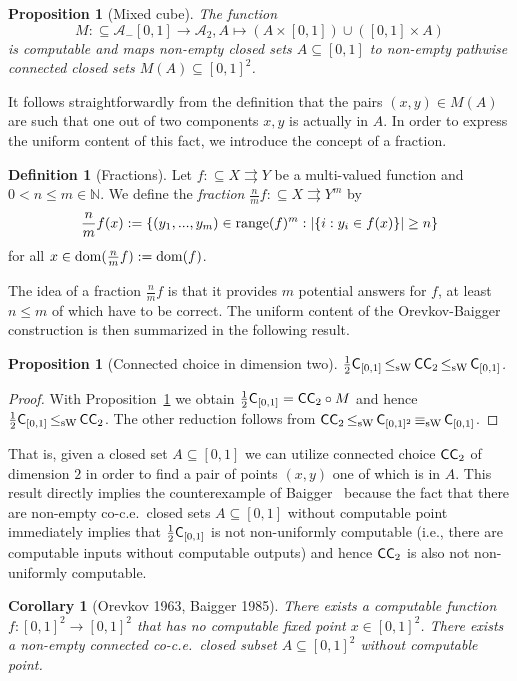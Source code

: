\documentclass[a4paper]{amsart}
\def\AA{{\mathcal A}}
\def\IN{{\mathbb{N}}}
\def\In{\subseteq}
\def\mto{\rightrightarrows}
\def\dom{{\rm dom}}
\def\range{{\rm range}}
\def\C{\mbox{\rm\sffamily C}}
\def\ConC{\mbox{\rm\sffamily CC}}
\def\leqSW{\mathop{\leq_{\mathrm{sW}}}}
\def\equivSW{\mathop{\equiv_{\mathrm{sW}}}}
\newtheorem{proposition}[theorem]{Proposition}
\newtheorem{corollary}[theorem]{Corollary}
\theoremstyle{definition}
\newtheorem{definition}[theorem]{Definition}
\begin{document}
\begin{proposition}[Mixed cube]
\label{prop:mixed-cube}
The function 
\[M:\In\AA_-[0,1]\to\AA_2,A\mapsto(A\times[0,1])\cup([0,1]\times A)\]
is computable and maps non-empty closed sets $A\In[0,1]$
to non-empty pathwise connected closed sets $M(A)\In[0,1]^2$.
\end{proposition}

It follows straightforwardly from the definition that the pairs $(x,y)\in M(A)$ are
such that one out of two components $x,y$ is actually in $A$. 
In order to express the uniform content of this fact, we introduce the concept of a fraction.

\begin{definition}[Fractions]
Let $f:\In X\mto Y$ be a multi-valued function and $0<n\leq m\in\IN$. We define the 
{\em fraction} $\frac{n}{m}f:\In X\mto Y^m$ by
\[\frac{n}{m}f(x):=\{(y_1,...,y_m)\in\range(f)^m:|\{i:y_i\in f(x)\}|\geq n\}\]
for all $x\in\dom(\frac{n}{m}f):=\dom(f)$.
\end{definition}

The idea of a fraction $\frac{n}{m}f$ is that it provides $m$ potential answers for $f$,
at least $n\leq m$ of which have to be correct. The uniform content of the Orevkov-Baigger construction is
then summarized in the following result.

\begin{proposition}[Connected choice in dimension two]
\label{prop:dimension-two}
$\frac{1}{2}\C_{[0,1]}\leqSW\ConC_2\leqSW\C_{[0,1]}$.
\end{proposition}
\begin{proof}
With Proposition~\ref{prop:mixed-cube} we obtain $\frac{1}{2}\C_{[0,1]}=\ConC_2\circ M$
and hence $\frac{1}{2}\C_{[0,1]}\leqSW\ConC_2$. The other reduction follows
from $\ConC_2\leqSW\C_{[0,1]^2}\equivSW\C_{[0,1]}$.
\end{proof}

That is, given a closed set $A\In[0,1]$ we can utilize connected choice $\ConC_2$ of dimension $2$
in order to find a pair of points $(x,y)$ one of which is in $A$. 
This result directly implies the counterexample of Baigger~\cite{Bai85} because
the fact that there are non-empty co-c.e.\ closed sets $A\In[0,1]$ without
computable point immediately implies that $\frac{1}{2}\C_{[0,1]}$ is not non-uniformly
computable (i.e., there are computable inputs without computable outputs) and hence
$\ConC_2$ is also not non-uniformly computable.

\begin{corollary}[Orevkov 1963, Baigger 1985]
\label{cor:Orevkov-Baigger}
There exists a computable function $f:[0,1]^2\to[0,1]^2$ that has no computable fixed point $x\in[0,1]^2$.
There exists a non-empty connected co-c.e.\ closed subset $A\In[0,1]^2$ without computable point.   
\end{corollary}
\end{document}
